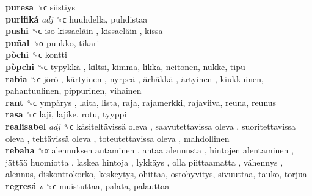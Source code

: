 \textbf{puresa} ␝ϲ  siistiys  \\
\textbf{purifiká} \emph{adj}  ␝ϲ  huuhdella, puhdistaa  \\
\textbf{pushi} ␝ϲ   iso kissaeläin ,  kissaeläin , kissa  \\
\textbf{puñal} ␝α  puukko, tikari  \\
\textbf{pòchi} ␝ϲ  kontti  \\
\textbf{pòpchi} ␝ϲ   typykkä , kiltsi, kimma, likka, neitonen, nukke, tipu  \\
\textbf{rabia} ␝ϲ   jörö ,  kärtyinen ,  nyrpeä ,  ärhäkkä ,  ärtyinen , kiukkuinen, pahantuulinen, pippurinen, vihainen  \\
\textbf{rant} ␝ϲ   ympärys , laita, lista, raja, rajamerkki, rajaviiva, reuna, reunus  \\
\textbf{rasa} ␝ϲ  laji, lajike, rotu, tyyppi  \\
\textbf{realisabel} \emph{adj}  ␝ϲ   käsiteltävissä oleva ,  saavutettavissa oleva ,  suoritettavissa oleva ,  tehtävissä oleva ,  toteutettavissa oleva , mahdollinen  \\
\textbf{rebaha} ␝α   alennuksen antaminen ,  antaa alennusta ,  hintojen alentaminen ,  jättää huomiotta ,  laskea hintoja ,  lykkäys ,  olla piittaamatta ,  vähennys , alennus, diskonttokorko, keskeytys, ohittaa, ostohyvitys, sivuuttaa, tauko, torjua  \\
\textbf{regresá} \emph{v}  ␝ϲ  muistuttaa, palata, palauttaa  \\
